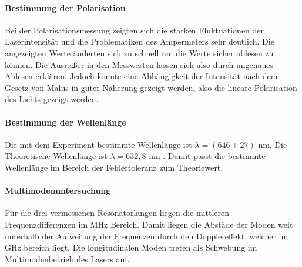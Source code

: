 \paragraph{Bestimmung der Polarisation}
Bei der Polarisationsmessung zeigten sich die starken Fluktuationen der Laserintensität
und die Problematiken des Ampermeters sehr deutlich. Die angezeigten Werte
änderten sich zu schnell um die Werte sicher ablesen zu können. Die Ausreißer
in den Messwerten lassen sich also durch ungenaues Ablesen erklären. Jedoch
konnte eine Abhängigkeit der Intensität nach dem Gesetz von Malus in guter
Näherung gezeigt werden, also die lineare Polarisation des Lichts gezeigt
werden.
\paragraph{Bestimmung der Wellenlänge}
Die mit dem Experiment bestimmte Wellenlänge ist $\lambda = (646 \pm 27)$ nm.
Die Theoretische Wellenlänge ist $\lambda = 632,8$ nm \cite{Anleitung}. Damit passt die bestimmte
Wellenlänge im Bereich der Fehlertoleranz zum Theoriewert.
\paragraph{Multimodenuntersuchung}
Für die drei vermessenen Resonatorlängen liegen die mittleren
Frequenzdifferenzen im MHz Bereich. Damit liegen die Abstäde der Moden weit
unterhalb der Aufweitung der Frequenzen durch den Dopplereffekt, welcher im
GHz bereich liegt. Die longitudinalen Moden treten als Schwebung im
Multimodenbetrieb des Lasers auf.
